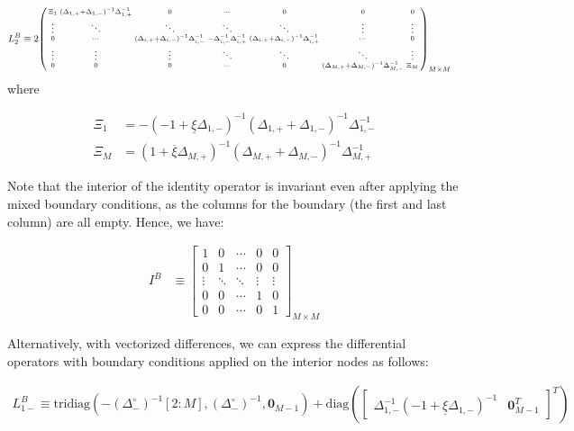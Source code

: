 \documentclass[11pt]{article}
\newcommand{\tridiag}{\ensuremath{\mathrm{tridiag}}}
\newcommand{\diag}{\ensuremath{\mathrm{diag}}}
\newenvironment{psmallmatrix}
{\left(\begin{smallmatrix}}
	{\end{smallmatrix}\right)}
\theoremstyle{definition}
\begin{document}
\begin{align}
L_2^B &\equiv 2 \begin{psmallmatrix}
\Xi_1 &
(\Delta_{1,+}+\Delta_{1,-})^{-1} \Delta_{1,+}^{-1}
&0&\cdots&0&0&0 \\
\vdots&\ddots&\ddots&\ddots&\ddots&\vdots&\vdots\\
0&\cdots&
(\Delta_{i,+}+\Delta_{i,-})^{-1} \Delta_{i,-}^{-1} &
-\Delta_{i,-}^{-1} \Delta_{i,+}^{-1}  &
 (\Delta_{i,+}+\Delta_{i,-})^{-1} \Delta_{i,+}^{-1}&\cdots&0 \\
\vdots&\vdots&\vdots&\ddots&\ddots&\ddots&\vdots\\
0&0&0&\cdots&0&(\Delta_{M,+}+\Delta_{M,-})^{-1} \Delta_{M,-}^{-1}&\Xi_M
\end{psmallmatrix}_{M\times M}\label{eq:L-2} 
\end{align}
where

\begin{align}
\Xi_{1} &= - (-1 + \underline{\xi} \Delta_{1,-})^{-1} (\Delta_{1,+} + \Delta_{1,-})^{-1}  \Delta_{1,-}^{-1} \\
\Xi_{M} &=  (1 + \overline{\xi} \Delta_{M,+})^{-1} (\Delta_{M,+} + \Delta_{M,-})^{-1}  \Delta_{M,+}^{-1} 
\end{align}

Note that the interior of the identity operator is invariant even after applying the mixed boundary conditions, as the columns for the boundary (the first and last column) are all empty. Hence, we have:

\begin{align}
I^B &\equiv \begin{bmatrix}
1 & 0 & \cdots & 0 & 0 \\
0 & 1 & \cdots & 0 & 0 \\
\vdots  & \ddots & \ddots &  \vdots  & \vdots   \\
0 & 0 & \cdots & 1 & 0 \\
0 & 0 & \cdots & 0 & 1
\end{bmatrix}_{M\times M}
\end{align}



Alternatively, with vectorized differences, we can express the differential operators with boundary conditions applied on the interior nodes as follows:


\begin{align}
{L}_{1-}^B \equiv
\tridiag \left(-(\Delta_-^\circ)^{-1}[2:M], (\Delta_-^\circ )^{-1}, \mathbf{0}_{M-1}  \right) +
\diag\left( 
\begin{bmatrix}
\Delta^{-1}_{1,-} (-1 + \underline{\xi} \Delta_{1,-})^{-1} &
\mathbf{0}_{M-1}^T
\end{bmatrix}^T
 \right)
\end{align}
\end{document}
